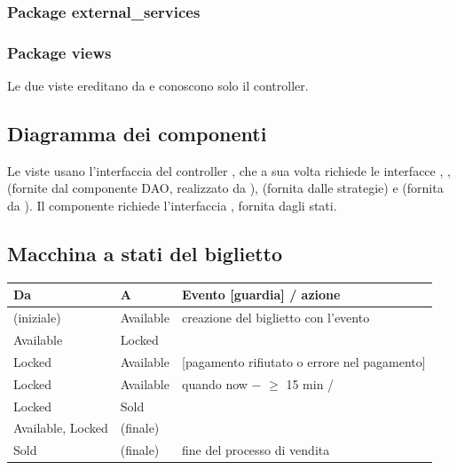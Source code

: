 \subsubsection*{Package external\_services}

\subsubsection*{Package views}
Le due viste ereditano da  e conoscono solo il controller.

\subsection{Diagramma dei componenti}


Le viste usano l'interfaccia del controller , che a sua volta richiede le interfacce , ,  (fornite dal componente DAO, realizzato da ),  (fornita dalle strategie) e  (fornita da ). Il componente  richiede l'interfaccia , fornita dagli stati.

\subsection{Macchina a stati del biglietto}


\begin{tabularx}{\textwidth}{@{}L{1.9cm}L{1.9cm}Y@{}}
\toprule
\textbf{Da} & \textbf{A} & \textbf{Evento [guardia] / azione} \\
\midrule
(iniziale) & Available & creazione del biglietto con l'evento \\
Available & Locked &  \\
Locked & Available &  [pagamento rifiutato o errore nel pagamento] \\
Locked & Available & quando now $-$  $\geq$ 15 min /  \\
Locked & Sold &  \\
Available, Locked & (finale) &  \\
Sold & (finale) & fine del processo di vendita \\
\bottomrule
\end{tabularx}

